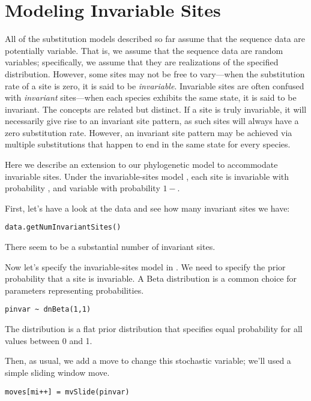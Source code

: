 \newpage
\section{Modeling Invariable Sites}
All of the substitution models described so far assume that the sequence data are potentially variable.
That is, we assume that the sequence data are random variables; specifically, we assume that they are realizations of the specified  distribution. 
However, some sites may not be free to vary---when the substitution rate of a site is zero, it is said to be \emph{invariable}.
Invariable sites are often confused with \emph{invariant} sites---when each species exhibits the same state, it is said to be invariant.
The concepts are related but distinct.
If a site is truly invariable, it will necessarily give rise to an invariant site pattern, as such sites will always have a zero substitution rate.
However, an invariant site pattern may be achieved via multiple substitutions that happen to end in the same state for every species.

Here we describe an extension to our phylogenetic model to accommodate invariable sites.
Under the invariable-sites model \citep[][]{Hasegawa1985}, each site is invariable with probability , and variable with probability $1-$.

First, let's have a look at the data and see how many invariant sites we have:
{\tt \begin{snugshade*}
\begin{lstlisting}
data.getNumInvariantSites()
\end{lstlisting}
\end{snugshade*}}
There seem to be a substantial number of invariant sites.

Now let's specify the invariable-sites model in \RevBayes.
We need to specify the prior probability that a site is invariable.
A Beta distribution is a common choice for parameters representing probabilities.
{\tt \begin{snugshade*}
\begin{lstlisting}
pinvar ~ dnBeta(1,1)
\end{lstlisting}
\end{snugshade*}}
The  distribution is a flat prior distribution that specifies equal probability for all values between 0 and 1.

Then, as usual, we add a move to change this stochastic variable; we'll used a simple sliding window move.
{\tt \begin{snugshade*}
\begin{lstlisting}
moves[mi++] = mvSlide(pinvar)
\end{lstlisting}
\end{snugshade*}}

